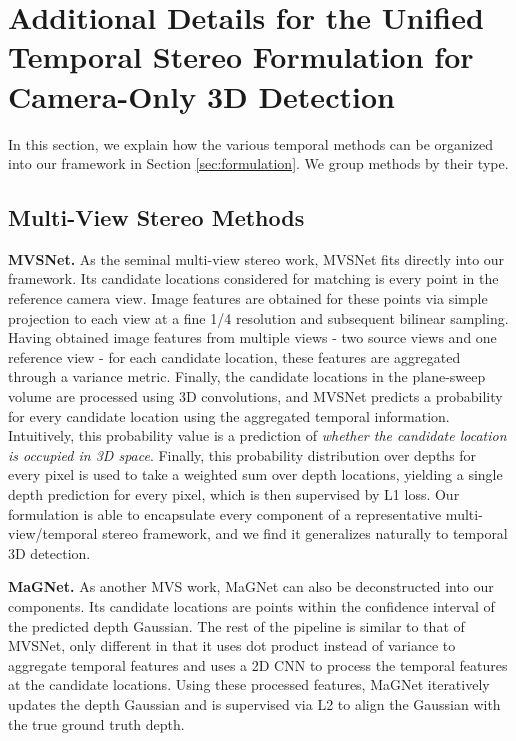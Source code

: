 \documentclass[runningheads, hyperfootnotes=false]{article}
\begin{document}
\newpage
\appendix
\section{Additional Details for the Unified Temporal Stereo Formulation for Camera-Only 3D Detection}\label{app:formulation}
In this section, we explain how the various temporal methods can be organized into our framework in Section \ref{sec:formulation}. We group methods by their type.
\subsection{Multi-View Stereo Methods}
\noindent\textbf{MVSNet.} As the seminal multi-view stereo work, MVSNet fits directly into our framework. Its candidate locations considered for matching is every  point in the reference camera view. Image features are obtained for these points via simple projection to each view at a fine 1/4 resolution and subsequent bilinear sampling. Having obtained image features from multiple views - two source views and one reference view - for each candidate location, these features are aggregated through a variance metric. Finally, the candidate locations in the plane-sweep volume are processed using 3D convolutions, and MVSNet predicts a probability for every  candidate location using the aggregated temporal information. Intuitively, this probability value is a prediction of \textit{whether the candidate location is occupied in 3D space}. Finally, this probability distribution over depths for every pixel is used to take a weighted sum over depth locations, yielding a single depth prediction for every pixel, which is then supervised by L1 loss. Our formulation is able to encapsulate every component of a representative multi-view/temporal stereo framework, and we find it generalizes naturally to temporal 3D detection.

\noindent\textbf{MaGNet.} As another MVS work, MaGNet can also be deconstructed into our components. Its candidate locations are  points within the confidence interval of the predicted depth Gaussian. The rest of the pipeline is similar to that of MVSNet, only different in that it uses dot product instead of variance to aggregate temporal features and uses a 2D CNN to process the temporal features at the candidate locations. Using these processed features, MaGNet iteratively updates the depth Gaussian and is supervised via L2 to align the Gaussian with the true ground truth depth. 
\end{document}
